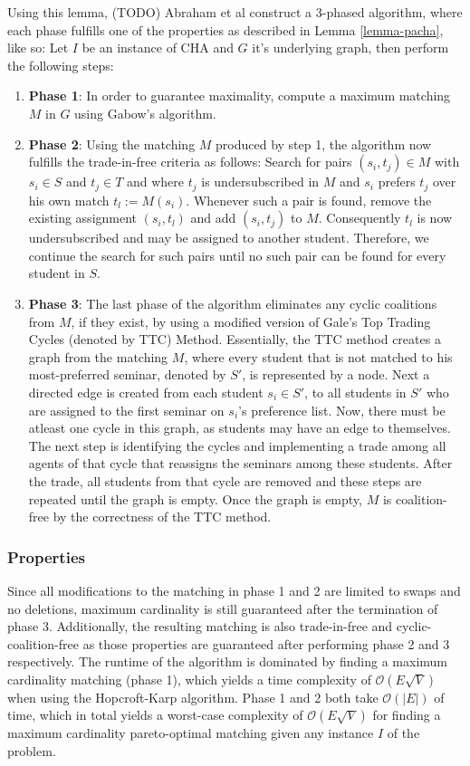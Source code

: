 Using this lemma, (TODO) Abraham et al \cite{Abraham:Pacha} construct a 3-phased algorithm, where each phase fulfills one of the properties as described in Lemma \ref{lemma-pacha}, like so: Let $I$ be an instance of CHA and $G$ it's underlying graph, then perform the following steps:
\begin{enumerate}
    \item \textbf{Phase 1}: In order to guarantee maximality, compute a maximum matching $M$ in $G$ using Gabow's algorithm. \cite{Gabow1983}
    \item \textbf{Phase 2}: Using the matching $M$ produced by step 1, the algorithm now fulfills the trade-in-free criteria as follows: Search for pairs $(s_i, t_j) \in M$ with $s_i \in S$ and $t_j \in T$ and where $t_j$ is undersubscribed in $M$ and $s_i$ prefers $t_j$ over his own match $t_l := M(s_i)$. Whenever such a pair is found, remove the existing assignment $(s_i, t_l)$ and add $(s_i, t_j)$ to $M$. Consequently $t_l$ is now undersubscribed and may be assigned to another student. Therefore, we continue the search for such pairs until no such pair can be found for every student in $S$.
    \item \textbf{Phase 3}: The last phase of the algorithm eliminates any cyclic coalitions from $M$, if they exist, by using a modified version of Gale's Top Trading Cycles (denoted by TTC) Method.\cite{ShapleyTTC} Essentially, the TTC method creates a graph from the matching $M$, where every student that is not matched to his most-preferred seminar, denoted by $S'$, is represented by a node. Next a directed edge is created from each student $s_i \in S'$, to all students in $S'$ who are assigned to the first seminar on $s_i$'s preference list. Now, there must be atleast one cycle in this graph, as students may have an edge to themselves. The next step is identifying the cycles and implementing a trade among all agents of that cycle that reassigns the seminars among these students. After the trade, all students from that cycle are removed and these steps are repeated until the graph is empty. Once the graph is empty, $M$ is coalition-free by the correctness of the TTC method.\cite{Abraham:Pacha}
\end{enumerate}

\subsubsection{Properties}
Since all modifications to the matching in phase 1 and 2 are limited to swaps and no deletions, maximum cardinality is still guaranteed after the termination of phase 3. Additionally, the resulting matching is also trade-in-free and cyclic-coalition-free as those properties are guaranteed after performing phase 2 and 3 respectively. The runtime of the algorithm is dominated by finding a maximum cardinality matching (phase 1), which yields a time complexity of $\mathcal{O}(E\sqrt{V})$\cite{Abraham:Pacha} when using the Hopcroft-Karp algorithm. Phase 1 and 2 both take $\mathcal{O}(|E|)$ of time\cite{SngThesis}, which in total yields a worst-case complexity of $\mathcal{O}(E\sqrt{V})$ for finding a maximum cardinality pareto-optimal matching given any instance $I$ of the problem.

